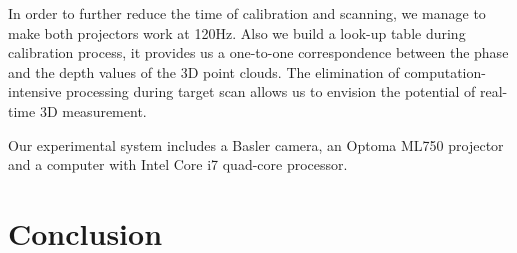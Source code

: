 \documentclass[10pt,letterpaper]{article}
\begin{document}
In order to further reduce the time of calibration and scanning, we manage to make both projectors work at 120Hz. Also we build a look-up table during calibration process, it provides us a one-to-one correspondence between the phase and the depth values of the 3D point clouds. The elimination of computation-intensive processing during target scan allows us to envision the potential of real-time 3D measurement.

Our experimental system includes a Basler camera, an Optoma ML750 projector and a computer with Intel Core i7 quad-core processor.



\section{Conclusion}
\end{document}
